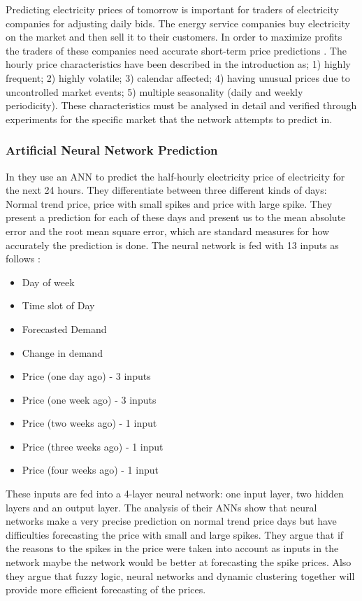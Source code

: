 Predicting electricity prices of tomorrow is important for traders of electricity companies for adjusting daily bids. The energy service companies buy electricity on the market and then sell it to their customers. In order to maximize profits the traders of these companies need accurate short-term price predictions \cite{EnergyPriceForecasting}. The hourly price characteristics have been described in the introduction as; 1) highly frequent; 2) highly volatile; 3) calendar affected; 4) having unusual prices due to uncontrolled market events; 5) multiple seasonality (daily and weekly periodicity). These characteristics must be analysed in detail and verified through experiments for the specific market that the network attempts to predict in. 

\subsubsection{Artificial Neural Network Prediction}\label{sec:scatterPaper}
In \cite{singhal2011electricity} they use an ANN to predict the half-hourly electricity price of electricity for the next 24 hours. They differentiate between three different kinds of days: Normal trend price, price with small spikes and price with large spike. They present a prediction for each of these days and present us to the mean absolute error and the root mean square error, which are standard measures for how accurately the prediction is done. The neural network is fed with 13 inputs as follows \cite{singhal2011electricity}:
\begin{itemize}[noitemsep,topsep=3pt,parsep=2pt,partopsep=3pt]
\item Day of week
\item Time slot of Day
\item Forecasted Demand
\item Change in demand
\item Price (one day ago) - 3 inputs 
\item Price (one week ago) - 3 inputs
\item Price (two weeks ago) - 1 input 
\item Price (three weeks ago) - 1 input 
\item Price (four weeks ago) - 1 input
\end{itemize}
These inputs are fed into a 4-layer neural network: one input layer, two hidden layers and an output layer. The analysis of their ANNs show that neural networks make a very precise prediction on normal trend price days but have difficulties forecasting the price with small and large spikes. They argue that if the reasons to the spikes in the price were taken into account as inputs in the network maybe the network would be better at forecasting the spike prices. Also they argue that fuzzy logic, neural networks and dynamic clustering together will provide more efficient forecasting of the prices.
